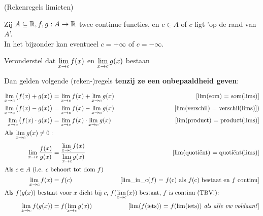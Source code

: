 \documentclass[numbers]{ximera}
\begin{document}
\begin{proposition} (Rekenregels limieten)
	
	Zij $A\subseteq\mathbb{R}, f,g:A\to\mathbb{R}$ twee continue functies, en $c\in A$ of $c$ ligt 'op de rand van $A$'. \\
	In het bijzonder kan eventueel $c=+\infty$ of $c=-\infty$. 
	
	Veronderstel dat $\limxc f(x)$ en $\limxc g(x)$ bestaan%
	
	Dan gelden volgende (reken-)regels  \textbf{\color{red} tenzij ze een {\large onbepaaldheid} geven}: 
	
	
	\begin{align}
		 \limxc \big(f(x) +g(x)\big) & = \limxc f(x) + \limxc g(x)  
		     & \text{[lim(som) = som(lims)]} \label{elim-som} \\
		 \limxc \big(f(x) -g(x)\big) & = \limxc f(x) - \limxc g(x)  
		     & \text{[lim(verschil) = verschil(lims)])} \label{elim-verschil}\\
		 \limxc \big(f(x)\cdot g(x)\big) & = \limxc f(x) \cdot \limxc g(x)  
		     & \text{[lim(product) =  product(lims)]} \label{elim-product} \\
		 \intertext{Als $\limxc g(x) \neq 0:$}
		 \limxc \dfrac{f(x)}{g(x)} & = \dfrac{\limxc f(x)}{\limxc g(x)}  
		     & \text{[lim(quotiënt) = quotiënt(lims)]} \label{elim-quotient} \\
		 \intertext{Als $c\in A$ (i.e. $c$ behoort tot dom $f$)} %
		 \limxc f(x) & = f(c) 
		     & \text{[lim\_in\_c($f$) = $f$(c) als $f$(c) bestaat en $f$ continu]} \label{elim-domein} \\
		 \intertext{Als $f(g(x))$ bestaat voor $x$ dicht bij $c$, $f(\limxc(x))$ bestaat, $f$ is continu (TBV!):} 
		 \limxc f(g(x)) & = f(\limxc g(x)) 
		     & \text{[lim($f$(iets)) =  $f$(lim(iets)) \textit{als alle vw voldaan!}]} \label{elim-continu} 
	\end{align}
\end{proposition}
\end{document}

